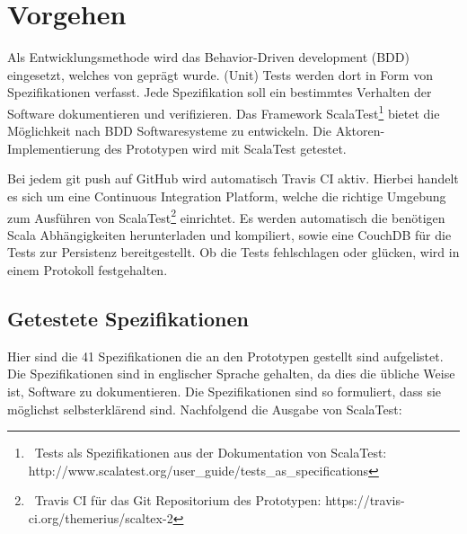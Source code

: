  
\section{Vorgehen}\label{}
 
Als Entwicklungsmethode wird das Behavior-Driven development (BDD) eingesetzt, welches von \citep{North} geprägt wurde. (Unit) Tests werden dort in Form von Spezifikationen verfasst. Jede Spezifikation soll ein bestimmtes Verhalten der Software dokumentieren und verifizieren. Das Framework ScalaTest\footnote{~Tests als Spezifikationen aus der Dokumentation von ScalaTest: http://www.scalatest.org/user\_guide/tests\_as\_specifications} bietet die Möglichkeit nach BDD Softwaresysteme zu entwickeln. Die Aktoren-Implementierung des Prototypen wird mit ScalaTest getestet.

 
Bei jedem git push auf GitHub wird automatisch Travis CI aktiv. Hierbei handelt es sich um eine Continuous Integration Platform, welche die richtige Umgebung zum Ausführen von ScalaTest\footnote{~Travis CI für das Git Repositorium des Prototypen: https://travis-ci.org/themerius/scaltex-2} einrichtet. Es werden automatisch die benötigen Scala Abhängigkeiten herunterladen und kompiliert, sowie eine CouchDB für die Tests zur Persistenz bereitgestellt. Ob die Tests fehlschlagen oder glücken, wird in einem Protokoll festgehalten.

 
\subsection{Getestete Spezifikationen}\label{}
 
Hier sind die 41 Spezifikationen die an den Prototypen gestellt sind aufgelistet. Die Spezifikationen sind in englischer Sprache gehalten, da dies die übliche Weise ist, Software zu dokumentieren. Die Spezifikationen sind so formuliert, dass sie möglichst selbsterklärend sind. Nachfolgend die Ausgabe von ScalaTest:

